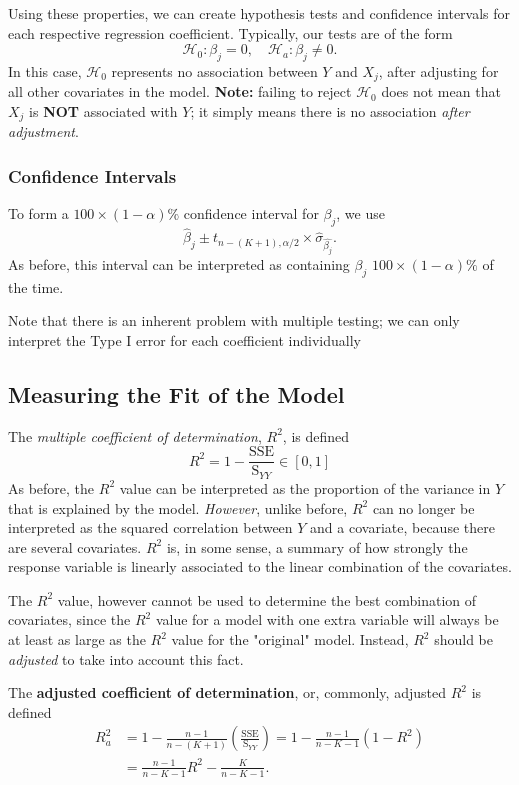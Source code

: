 \documentclass[12pt]{article}
\begin{document}
Using these properties, we can create hypothesis tests and confidence intervals for each respective regression coefficient. Typically, our tests are of the form \[\mathcal{H}_0: \beta_j = 0, \quad \mathcal{H}_a: \beta_j \neq 0.\] In this case, $\mathcal{H}_0$ represents no association between $Y$ and $X_j$, after adjusting for all other covariates in the model. \textbf{Note:} failing to reject $\mathcal{H}_0$ does not mean that $X_j$ is \textbf{NOT} associated with $Y$; it simply means there is no association \textit{after adjustment}.

\subsubsection{Confidence Intervals}

To form a $100 \times (1 - \alpha)\%$ confidence interval for $\beta_j$, we use \[\hat{\beta}_j \pm t_{n- (K+1), \alpha/2}\times \hat{\sigma}_{\hat{\beta_j}}.\] As before, this interval can be interpreted as containing $\beta_j$ $100 \times (1 - \alpha) \%$ of the time.

Note that there is an inherent problem with multiple testing; we can only interpret the Type I error for each coefficient individually 

\subsection{Measuring the Fit of the Model}

The \textit{multiple coefficient of determination}, $R^2$, is defined \[R^2 = 1 - \frac{\text{SSE}}{\text{S}_{YY}} \in [0,1]\] As before, the $R^2$ value can be interpreted as the proportion of the variance in $Y$ that is explained by the model. \textit{However}, unlike before, $R^2$ can no longer be interpreted as the squared correlation between $Y$ and a covariate, because there are several covariates. $R^2$ is, in some sense, a summary of how strongly the response variable is linearly associated to the linear combination of the covariates.

The $R^2$ value, however cannot be used to determine the best combination of covariates, since the $R^2$ value for a model with one extra variable will always be at least as large as the $R^2$ value for the "original" model. Instead, $R^2$ should be \textit{adjusted} to take into account this fact. 

The \textbf{adjusted coefficient of determination}, or, commonly, adjusted $R^2$ is defined \begin{align*}
    R_a^2 &= 1- \frac{n-1}{n-(K+1)}(\frac{\text{SSE}}{\text{S}_{YY}}) = 1 - \frac{n-1}{n - K - 1}(1-R^2)\\
    &= \frac{n-1}{n-K-1}R^2-\frac{K}{n-K-1}.
\end{align*}
\end{document}
